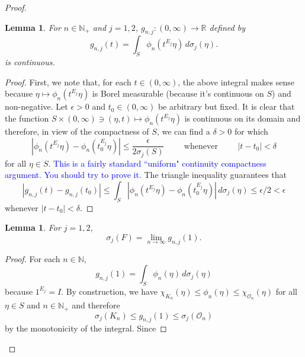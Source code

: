 \documentclass[11pt]{article}
\theoremstyle{theorem}
\newtheorem{lemma}[theorem]{Lemma}
\newcommand*{\myproofname}{Proof}
\newenvironment{subproof}[1][\myproofname]{\begin{proof}[#1]\renewcommand*{\qedsymbol}{$\mathbin{/\mkern-6mu/}$}}{\end{proof}}
\begin{document}
\begin{proof}
\begin{lemma}
For $n\in\mathbb{N}_+$ and $j=1,2$, $g_{n,j}:(0,\infty)\to\mathbb{R}$ defined by
\begin{equation*}
g_{n,j}(t)=\int_S\phi_n(t^{E_j}\eta)\,d\sigma_j(\eta).
\end{equation*}
is continuous.
\end{lemma}
\begin{subproof}
First, we note that, for each $t\in (0,\infty)$, the above integral makes sense because $\eta\mapsto \phi_n(t^{E_j}\eta)$ is Borel measurable (because it's continuous on $S$) and non-negative. Let $\epsilon>0$ and $t_0\in (0,\infty)$ be arbitrary but fixed. It is clear that the function $S\times (0,\infty)\ni (\eta,t)\mapsto \phi_n(t^{E_j}\eta)$ is continuous on its domain and therefore, in view of the compactness of $S$, we can find a $\delta>0$ for which
\begin{equation*}
|\phi_n(t^{E_j}\eta)-\phi_n(t_0^{E_j}\eta)|\leq\frac{\epsilon}{2\sigma_j(S)}\hspace{1cm}\mbox{whenever}\hspace{1cm}|t-t_0|<\delta
\end{equation*}
for all $\eta\in S$. \textcolor{blue}{This is a fairly standard ``uniform" continuity compactness argument. You should try to prove it.} The triangle inequality guarantees that
\begin{equation*}
|g_{n,j}(t)-g_{n,j}(t_0)|\leq \int_S|\phi_n(t^{E_j}\eta)-\phi_n(t_0^{E_j}\eta)|\,d\sigma_j(\eta)\leq\epsilon/2<\epsilon
\end{equation*}
whenever $|t-t_0|<\delta$.
\end{subproof}
\begin{lemma}
For $j=1,2$,
\begin{equation*}
\sigma_j(F)=\lim_{n\to\infty}g_{n,j}(1).
\end{equation*}
\end{lemma}
\begin{subproof}
For each $n\in\mathbb{N}$,
\begin{equation*}
g_{n,j}(1)=\int_{S}\phi_n(\eta)\,d\sigma_j(\eta)
\end{equation*}
because $1^{E_j}=I$. By construction, we have $\chi_{K_n}(\eta)\leq\phi_{n}(\eta)\leq \chi_{\mathcal{O}_n}(\eta)$ for all $\eta\in S$ and $n\in\mathbb{N}_+$ and therefore
\begin{equation*}
\sigma_j(K_n)\leq g_{n,j}(1)\leq \sigma_{j}(\mathcal{O}_n)
\end{equation*}
by the monotonicity of the integral. Since

\end{subproof}
\end{proof}
\end{document}
